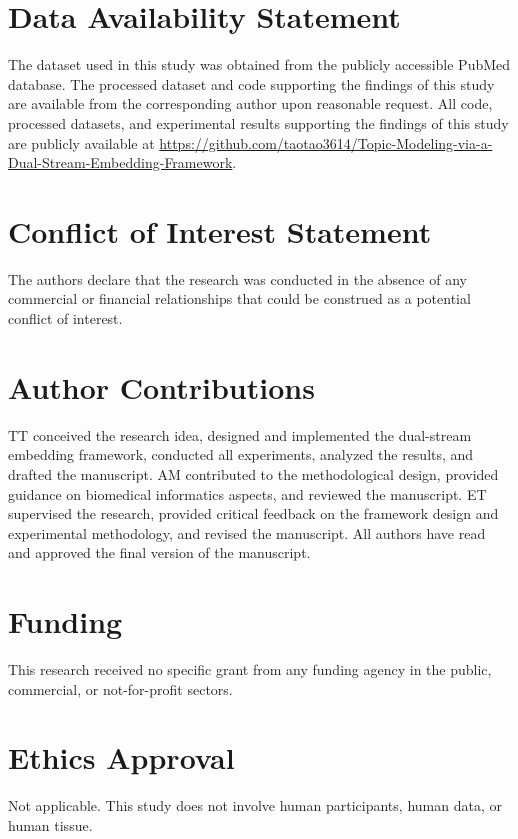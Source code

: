 \documentclass[utf8]{FrontiersinHarvard}
\begin{document}
\section*{Data Availability Statement}
The dataset used in this study was obtained from the publicly accessible PubMed database. The processed dataset and code supporting the findings of this study are available from the corresponding author upon reasonable request. All code, processed datasets, and experimental results supporting the findings of this study are publicly available at \url{https://github.com/taotao3614/Topic-Modeling-via-a-Dual-Stream-Embedding-Framework}.

\section*{Conflict of Interest Statement}
The authors declare that the research was conducted in the absence of any commercial or financial relationships that could be construed as a potential conflict of interest.

\section*{Author Contributions}
TT conceived the research idea, designed and implemented the dual-stream embedding framework, conducted all experiments, analyzed the results, and drafted the manuscript. AM contributed to the methodological design, provided guidance on biomedical informatics aspects, and reviewed the manuscript. ET supervised the research, provided critical feedback on the framework design and experimental methodology, and revised the manuscript. All authors have read and approved the final version of the manuscript.

\section*{Funding}
This research received no specific grant from any funding agency in the public, commercial, or not-for-profit sectors.

\section*{Ethics Approval}
Not applicable. This study does not involve human participants, human data, or human tissue.



\end{document}
